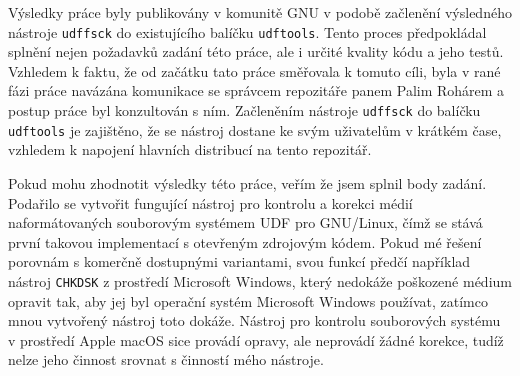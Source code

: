 Výsledky práce byly publikovány v komunitě GNU v podobě začlenění výsledného nástroje \texttt{udffsck} do existujícího balíčku \texttt{udftools}. Tento proces předpokládal splnění nejen požadavků zadání této práce, ale i určité kvality kódu a jeho testů. Vzhledem k faktu, že od začátku tato práce směřovala k tomuto cíli, byla v rané fázi práce navázána komunikace se správcem repozitáře panem Palim Rohárem a postup práce byl konzultován s ním. Začleněním nástroje \texttt{udffsck} do balíčku \texttt{udftools} je zajištěno, že se nástroj dostane ke svým uživatelům v krátkém čase, vzhledem k napojení hlavních distribucí na tento repozitář.

Pokud mohu zhodnotit výsledky této práce, veřím že jsem splnil body zadání. Podařilo se vytvořit fungující nástroj pro kontrolu a korekci médií naformátovaných souborovým systémem UDF pro GNU/Linux, čímž se stává první takovou implementací s otevřeným zdrojovým kódem. Pokud mé řešení porovnám s komerčně dostupnými variantami, svou funkcí předčí například nástroj \texttt{CHKDSK} z prostředí Microsoft Windows, který nedokáže poškozené médium opravit tak, aby jej byl operační systém Microsoft Windows používat, zatímco mnou vytvořený nástroj toto dokáže. Nástroj pro kontrolu souborových systému v prostředí Apple macOS sice provádí opravy, ale neprovádí žádné korekce, tudíž nelze jeho činnost srovnat s činností mého nástroje.
